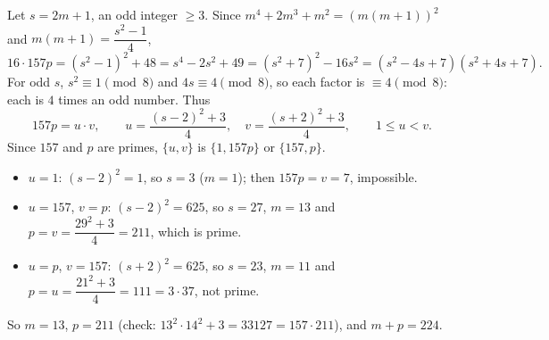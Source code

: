 Let $s=2m+1$, an odd integer $\ge3$. Since $m^4+2m^3+m^2=\left(m(m+1)\right)^2$ and $m(m+1)=\dfrac{s^2-1}{4}$,
\[
16\cdot157p=(s^2-1)^2+48=s^4-2s^2+49=(s^2+7)^2-16s^2=(s^2-4s+7)(s^2+4s+7).
\]
For odd $s$, $s^2\equiv1\pmod8$ and $4s\equiv4\pmod8$, so each factor is $\equiv4\pmod8$: each is $4$ times an odd number. Thus
\[
157p=u\cdot v,\qquad u=\dfrac{(s-2)^2+3}{4},\quad v=\dfrac{(s+2)^2+3}{4},\qquad 1\le u<v .
\]
Since $157$ and $p$ are primes, $\{u,v\}$ is $\{1,157p\}$ or $\{157,p\}$.
\begin{itemize}
\item $u=1$: $(s-2)^2=1$, so $s=3$ ($m=1$); then $157p=v=7$, impossible.
\item $u=157$, $v=p$: $(s-2)^2=625$, so $s=27$, $m=13$ and $p=v=\dfrac{29^2+3}{4}=211$, which is prime.
\item $u=p$, $v=157$: $(s+2)^2=625$, so $s=23$, $m=11$ and $p=u=\dfrac{21^2+3}{4}=111=3\cdot37$, not prime.
\end{itemize}
So $m=13$, $p=211$ (check: $13^2\cdot14^2+3=33127=157\cdot211$), and $m+p=\boxed{224}$.
